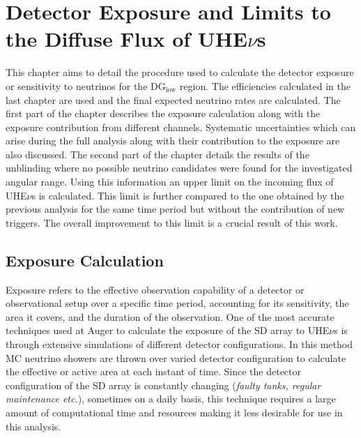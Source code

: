 
\chapter{Detector Exposure and Limits to the Diffuse Flux of UHE\texorpdfstring{$\nu$}{}s}
\label{chap:exp_limits_diffuse}
 
This chapter aims to detail the procedure used to calculate the detector exposure or sensitivity to neutrinos for the DG$\mathrm{_{\text{low}}}$ region. The efficiencies calculated in the last chapter are used and the final expected neutrino rates are calculated. The first part of the chapter describes the exposure calculation along with the exposure contribution from different channels. Systematic uncertainties which can arise during the full analysis along with their contribution to the exposure are also discussed. 
The second part of the chapter details the results of the unblinding where no possible neutrino candidates were found for the investigated angular range. Using this information an upper limit on the incoming flux of UHE$\nu$s is calculated. This limit is further compared to the one obtained by the previous analysis for the same time period but without the contribution of new triggers. The overall improvement to this limit is a crucial result of this work. 


\section{Exposure Calculation}
\label{sec:det_exposure_calc}

Exposure refers to the effective observation capability of a detector or observational setup over a specific time period, accounting for its sensitivity, the area it covers, and the duration of the observation. One of the most accurate techniques used at Auger to calculate the exposure of the SD array to UHE$\nu$s is through extensive simulations of different detector configurations. In this method MC neutrino showers are thrown over varied detector configuration to calculate the effective or active area at each instant of time. Since the detector configuration of the SD array is constantly changing (\textit{faulty tanks, regular maintenance etc.}), sometimes on a daily basis, this technique requires a large amount of computational time and resources making it less desirable for use in this analysis. 

